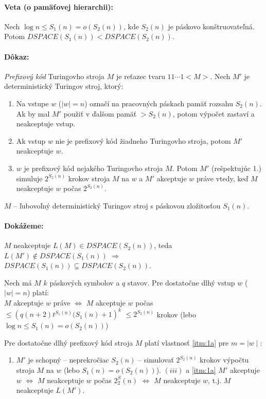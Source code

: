 \documentclass{article}
\begin{document}
\paragraph{Veta (o pamäťovej hierarchii):} Nech $\log n \le S_1(n) = o(S_2(n))$,
kde $S_2(n)$ je páskovo konštruovateľná. Potom $DSPACE(S_1(n)) <
DSPACE(S_2(n))$.

\paragraph{Dôkaz:} \emph{Prefixový kód} Turingovho stroja $M$ je reťazec tvaru
$11\cdots1<M>$. Nech $M'$ je deterministický Turingov stroj, ktorý:
\begin{enumerate}
	\item Na vstupe $w$ ($\mid w 
		\mid = n$) označí na pracovných páskach pamäť rozsahu $S_2(n)$.
		Ak by mal $M'$ použiť v ďalšom pamäť $ > S_2(n)$, potom výpočet
		zastaví a neakceptuje vstup.
	\item Ak vstup $w$ nie je prefixový kód žiadneho Turingovho stroja,
		potom $M'$ neakceptuje $w$.
	\item $w$ je prefixový kód nejakého Turingovho stroja $M$. Potom $M'$
		(rešpektujúc 1.) simuluje $2^{S_2(n)}$ krokov stroja $M$ na $w$
		a $M'$ akceptuje $w$ práve vtedy, keď $M$ neakceptuje $w$ počas
		$2^{S_2(n)}$.
\end{enumerate}

\par $M$ -- ľubovoľný deterministický Turingov stroj s páskovou zložitosťou
$S_1(n)$.

\paragraph{Dokážeme:} $M$ neakceptuje $L(M) \in DSPACE(S_2(n))$, teda
$L(M') \notin DSPACE(S_1(n))$ $\Rightarrow$ $DSPACE(S_1(n)) \subsetneq
DSPACE(S_2(n))$.
\par Nech má $M$ $k$ páskových symbolov a $q$ stavov. Pre dostatočne dlhý vstup
$w$ ( $\mid w\mid = n$) platí: \\
	$M$ akceptuje $w$ práve $\iff$ $M$ akceptuje $w$ počas $\leq
	\left(q(n+2)t^{S_1(n)}(S_1(n)+1\right)^k$ $\leq 2^{S_2(n)}$ krokov (lebo $\log n
	\leq S_1(n) = o(S_2(n))$)

	\par Pre dostatočne dlhý prefixový kód stroja $M$ platí vlastnosť
	\ref{itm:1a} pre $m =
	\mid w \mid$:
	\begin{enumerate}
		\item \label{itm:1a} $M'$ je schopný -- neprekročiac $S_2(n)$ --
			simulovať $2^{S_2(n)}$ krokov výpočtu stroja $M$ na $w$ (lebo
			$S_1(n) = o(S_2(n))$).
			$(iii)$ a \ref{itm:1a} $M'$ akceptuje $w$ $\iff$ $M$ neakceptuje
			$w$ počas $2^S_2(n)$ $\iff$ $M$ neakceptuje $w$, t.j. $M$
			neakceptuje $L(M')$.
	\end{enumerate}
\end{document}
